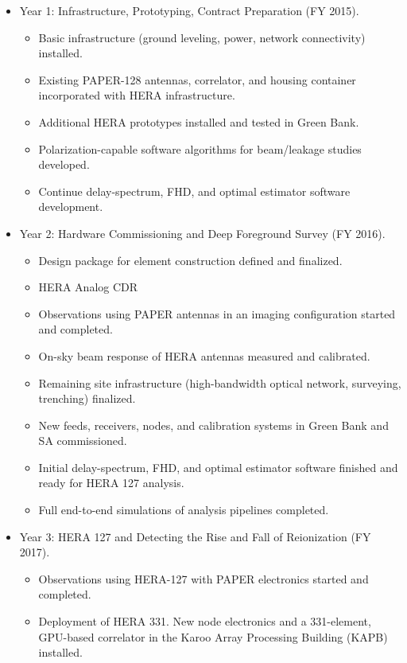 \documentclass[preprint]{aastex}
\begin{document}
\begin{itemize}[itemsep=-4pt,parsep=0pt]
\item Year 1:  Infrastructure, Prototyping, Contract Preparation (FY 2015).
\begin{itemize}[itemsep=-4pt,parsep=0pt]
\item Basic infrastructure (ground leveling, power, network connectivity) installed.
\item Existing PAPER-128 antennas, correlator, and housing container incorporated with HERA infrastructure.
\item Additional HERA prototypes installed and tested in Green Bank.
\item Polarization-capable software algorithms for beam/leakage studies developed.
\item Continue delay-spectrum, FHD, and optimal estimator software development.
\end{itemize}
\item Year 2:  Hardware Commissioning and Deep Foreground Survey (FY 2016). 
\begin{itemize}[itemsep=-4pt]
\item Design package for element construction defined and finalized.
\item HERA Analog CDR
\item Observations using PAPER antennas in an imaging configuration started and completed.
\item On-sky beam response of HERA antennas measured and calibrated.
\item Remaining site infrastructure (high-bandwidth optical network, surveying, trenching) finalized.
\item New feeds, receivers, nodes, and calibration systems in Green Bank and SA commissioned.
\item Initial delay-spectrum, FHD, and optimal estimator software finished and ready for HERA 127 analysis.
\item Full end-to-end simulations of analysis pipelines completed.
\end{itemize}
\item Year 3:  HERA 127 and Detecting the Rise and Fall of Reionization (FY 2017). 
\begin{itemize}[itemsep=-4pt]
\item Observations using HERA-127 with PAPER electronics started and completed.
\item Deployment of HERA 331. New node electronics and a 331-element, GPU-based correlator in the Karoo Array Processing Building (KAPB) installed.

\end{itemize}
\end{itemize}
\end{document}
